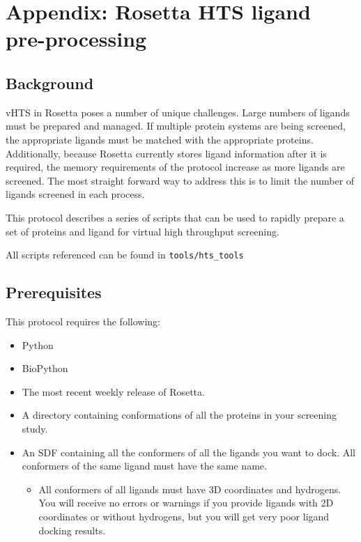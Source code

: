 \chapter{Appendix: Rosetta HTS ligand pre-processing}
\label{chap:hts_preprocess}
\section{Background}

\ac{vHTS} in Rosetta poses a number of unique challenges.
Large numbers of ligands must be prepared and managed.
If multiple protein systems are being screened, the appropriate ligands must be matched with the appropriate proteins. 
Additionally, because Rosetta currently stores ligand information after it is required, the memory requirements of the protocol increase as more ligands are screened.
The most straight forward way to address this is to limit the number of ligands screened in each process.

This protocol describes a series of scripts that can be used to rapidly prepare a set of proteins and ligand for virtual high throughput screening.

All scripts referenced can be found in \texttt{tools/hts\_tools}

\section{Prerequisites}

This protocol requires the following:

\begin{itemize}
\item Python
\item BioPython
\item The most recent weekly release of Rosetta.
\item A directory containing conformations of all the proteins in your screening study.
\item An \ac{SDF} containing all the conformers of all the ligands you want to dock. All conformers of the same ligand must have the same name.
	\begin{itemize}
	\item All conformers of all ligands must have 3D coordinates and hydrogens.
	You will receive no errors or warnings if you provide ligands with 2D coordinates or without hydrogens, but you will get very poor ligand docking results.
	\end{itemize}
\end{itemize}

